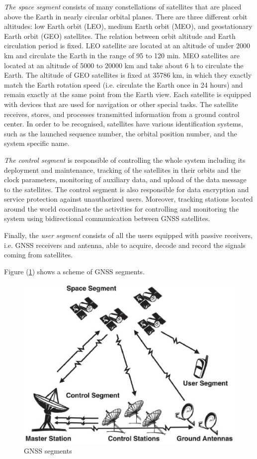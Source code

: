 \textit{The space segment} consists of many constellations of satellites that are placed above the Earth in nearly circular orbital planes. There are three different orbit altitudes: low Earth orbit (LEO), medium Earth orbit (MEO), and geostationary Earth orbit (GEO) satellites.
The relation between orbit altitude and Earth circulation period is fixed. LEO satellite are located at an altitude of under 2000 km and circulate the Earth in the range of 95 to 120 min. MEO satellites are located at an altitude of 5000 to 20000 km and take about 6 h to circulate the Earth. The altitude of GEO satellites is fixed at 35786 km, in which they exactly match the Earth rotation speed (i.e. circulate the Earth once in 24 hours) and remain exactly at the same point from the Earth view. Each satellite is equipped with devices that are used for navigation or other special tasks. The satellite receives, stores, and processes transmitted information from a ground control center. In order to be recognised, satellites have various identification systems, such as the launched sequence number, the orbital position number, and the system specific name.

\textit{The control segment} is responsible of controlling the whole
system including its deployment and maintenance, tracking of the satellites in their orbits and the clock parameters, monitoring of auxiliary data, and upload of the data message to the satellites. The control segment is also responsible for data encryption and service protection against unauthorized users. Moreover, tracking stations located around the world coordinate the activities for controlling and monitoring the system using bidirectional communication between GNSS satellites.

Finally, the \textit{user segment} consists of all the users equipped with passive receivers, i.e. GNSS receivers and antenna, able to acquire, decode and record the signals coming from satellites.

Figure (\ref{FIG:GNSSsegments}) shows a scheme of GNSS segments.

\begin{figure}[ht] 
	\centering
	\includegraphics[scale=0.5]{fig/GNSSsegments.eps} 
	\caption{GNSS segments}
	\label{FIG:GNSSsegments} 
\end{figure}

